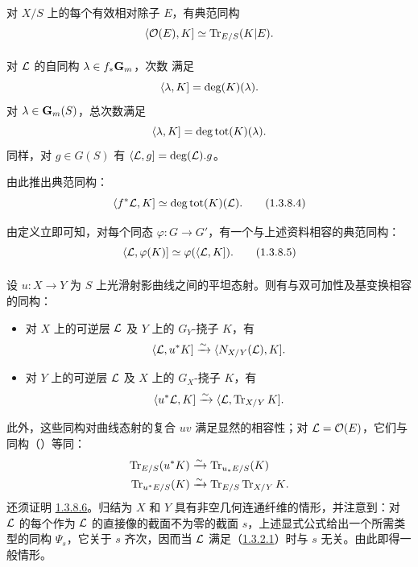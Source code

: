 \paragraph{} 对 $X/S$ 上的每个有效相对除子 $E$，有典范同构 $$
\langle {\mathcal O}(E),K]\simeq \operatorname{Tr}_{E/S}(K|E){}.
$$

\paragraph{} 对 ${\mathcal L}$ 的自同构 $\lambda\in f_{\ast}\mathbf{G}_{m}$，次数  满足 $$
\langle \lambda,K]=\deg(K)(\lambda){}.
$$ 对 $\lambda\in \mathbf{G}_{m}(S)$，总次数满足 $$
\langle \lambda,K]=\deg\operatorname{tot}(K)(\lambda){}.
$$ 同样，\pageoriginale 对 $g\in G(S)$ 有 $\langle {\mathcal L},g]=\deg({\mathcal L}).g$。

由此推出典范同构： \begin{equation*}
\langle f^{\ast}{\mathcal L},K]\simeq \deg\operatorname{tot}(K)({\mathcal L}){}.\tag{1.3.8.4}
\end{equation*}

由定义立即可知，对每个同态 $\varphi:G\rightarrow G'$，有一个与上述资料相容的典范同构： \begin{equation*}
\langle {\mathcal L},\varphi(K)]\simeq \varphi(\langle {\mathcal L},K]){}.\tag{1.3.8.5}
\end{equation*}

\setcounter{paragraph}{5} \paragraph{} 设 $u:X\rightarrow Y$ 为 $S$ 上光滑射影曲线之间的平坦态射。则有与双可加性及基变换相容的同构： \begin{itemize} \item[--] 对 $X$ 上的可逆层 ${\mathcal L}$ 及 $Y$ 上的 $G_{Y}$-挠子 $K$，有 $$
\langle {\mathcal L}, u^{\ast}K]\xrightarrow{\sim}\langle N_{X/Y}({\mathcal L}),K]{}.
$$

\item[--] 对 $Y$ 上的可逆层 ${\mathcal L}$ 及 $X$ 上的 $G_{X}$-挠子 $K$，有 $$
\langle u^{\ast}{\mathcal L},K]\xrightarrow{\sim}
\langle {\mathcal L},\operatorname{Tr}_{X/Y}K]{}.
$$ \end{itemize} 此外，这些同构对曲线态射的复合 $uv$ 满足显然的相容性；对 ${\mathcal L}={\mathcal O}(E)$，它们与同构（）等同： \begin{align*}
\operatorname{Tr}_{E/S}(u^{\ast}K) &\xrightarrow{\sim} \operatorname{Tr}_{u_{\ast}E/S}(K)\\
\operatorname{Tr}_{u^{\ast}E/S}(K) &\xrightarrow{\sim} \operatorname{Tr}_{E/S}\operatorname{Tr}_{X/Y}K{}.
\end{align*} 还须证明 \hyperref[XVIII.par1.3.8.6]{1.3.8.6}。归结为 $X$ 和 $Y$ 具有非空几何连通纤维的情形，并注意到：对 ${\mathcal L}$ 的每个作为 ${\mathcal L}$ 的直接像的截面不为零的截面 $s$，上述显式公式给出一个所需类型的同构 $\Psi_{s}$，它关于 $s$ 齐次，因而当 ${\mathcal L}$ 满足（\hyperref[XVIII.par1.3.2.1]{1.3.2.1}）时与 $s$ 无关。由此即得一般情形。

